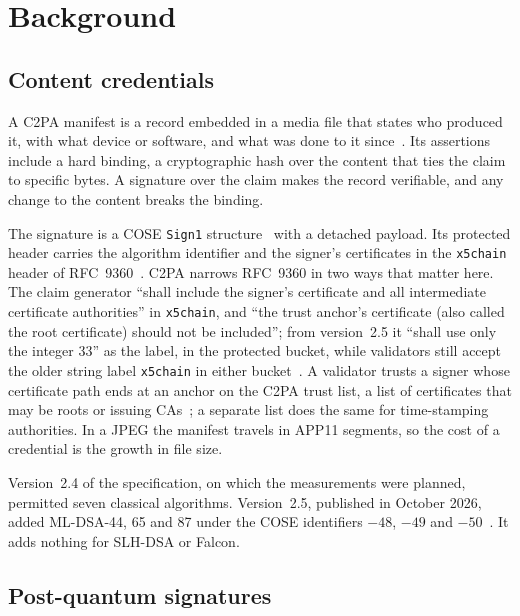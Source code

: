 \section{Background}
\label{sec:background}

\subsection{Content credentials}

A C2PA manifest is a record embedded in a media file that states who produced
it, with what device or software, and what was done to it since~\cite{c2pa25}.
Its assertions include a hard binding, a cryptographic hash over the content
that ties the claim to specific bytes. A signature over the claim makes the
record verifiable, and any change to the content breaks the binding.

The signature is a COSE \texttt{Sign1} structure~\cite{rfc9052} with a
detached payload. Its protected header carries the algorithm identifier and the
signer's certificates in the \texttt{x5chain} header of
RFC~9360~\cite{rfc9360}. C2PA narrows RFC~9360 in two ways that matter here.
The claim generator ``shall include the signer's certificate and all intermediate certificate authorities'' in \texttt{x5chain}, and ``the trust anchor's certificate (also called the root certificate) should not be included''; from version~2.5 it ``shall use only the integer 33'' as the label, in the protected bucket, while validators still accept the older string label
\texttt{x5chain} in either bucket~\cite{c2pa25}. A validator trusts a signer
whose certificate path ends at an anchor on the C2PA trust list, a list of
certificates that may be roots or issuing CAs~\cite{c2patrustlist}; a separate
list does the same for time-stamping authorities. In a JPEG the manifest
travels in APP11 segments, so the cost of a credential is the growth in file
size.

Version~2.4 of the specification, on which the measurements were planned,
permitted seven classical algorithms. Version~2.5, published in October 2026,
added ML-DSA-44, 65 and 87 under the COSE identifiers $-48$, $-49$ and
$-50$~\cite{c2pa25}. It adds nothing for SLH-DSA or Falcon.

\subsection{Post-quantum signatures}

